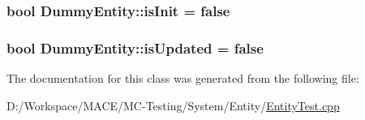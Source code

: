 \subsubsection[{\texorpdfstring{is\+Init}{isInit}}]{\setlength{\rightskip}{0pt plus 5cm}bool Dummy\+Entity\+::is\+Init = false}\hypertarget{class_dummy_entity_ac100cd068f11a70d7f7bf5c032152598}{}\label{class_dummy_entity_ac100cd068f11a70d7f7bf5c032152598}
\subsubsection[{\texorpdfstring{is\+Updated}{isUpdated}}]{\setlength{\rightskip}{0pt plus 5cm}bool Dummy\+Entity\+::is\+Updated = false}\hypertarget{class_dummy_entity_aecb9da8269df00e4864787b38017131c}{}\label{class_dummy_entity_aecb9da8269df00e4864787b38017131c}


The documentation for this class was generated from the following file\+:\begin{DoxyCompactItemize}
\item 
D\+:/\+Workspace/\+M\+A\+C\+E/\+M\+C-\/\+Testing/\+System/\+Entity/\hyperlink{_entity_test_8cpp}{Entity\+Test.\+cpp}\end{DoxyCompactItemize}
